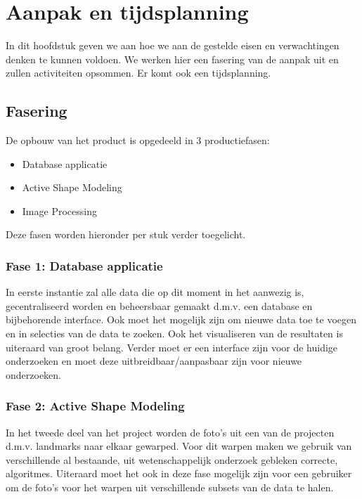\section{Aanpak en tijdsplanning}
\label{aanpak_en_tijdsplanning}

In dit hoofdstuk geven we aan hoe we aan de gestelde eisen en verwachtingen denken te kunnen voldoen. We werken hier een fasering van de aanpak uit en zullen activiteiten opsommen. Er komt ook een tijdsplanning.

\subsection{Fasering}

De opbouw van het product is opgedeeld in 3 productiefasen:
\begin{itemize}
	\item Database applicatie
	\item Active Shape Modeling
	\item Image Processing
\end{itemize}
Deze fasen worden hieronder per stuk verder toegelicht.

\subsubsection{Fase 1: Database applicatie}
In eerste instantie zal alle data die op dit moment in het \casamproject aanwezig is, gecentraliseerd worden en beheersbaar gemaakt d.m.v. een database en bijbehorende interface. 
Ook moet het mogelijk zijn om nieuwe data toe te voegen en in selecties van de data te zoeken. 
Ook het visualiseren van de resultaten is uiteraard van groot belang. 
Verder moet er een interface zijn voor de huidige onderzoeken en moet deze uitbreidbaar/aanpasbaar zijn voor nieuwe onderzoeken.

\subsubsection{Fase 2: Active Shape Modeling}
In het tweede deel van het project worden de foto's uit een van de projecten d.m.v. landmarks naar elkaar gewarped. 
Voor dit warpen maken we gebruik van verschillende al bestaande, uit wetenschappelijk onderzoek gebleken correcte, algoritmes.
Uiteraard moet het ook in deze fase mogelijk zijn voor een gebruiker om de foto's voor het warpen uit verschillende subsets van de data te halen.

